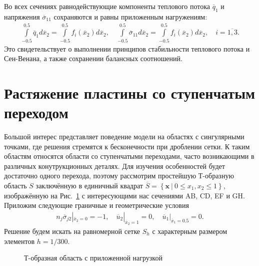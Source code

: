 Во всех сечениях равнодействующие компоненты теплового потока $\overline{q}_1$ и напряжения $\overline{\sigma}_{11}$ сохраняются и равны приложенным нагружениям:
\begin{gather*}
	\int\limits_{-0.5}^{0.5} \overline{q}_1 d\overline{x}_2 = 
	\int\limits_{-0.5}^{0.5} f_i (\overline{x}_2) d\overline{x}_2,
	\quad
	\int\limits_{-0.5}^{0.5} \overline{\sigma}_{11} d\overline{x}_2 = 
	\int\limits_{-0.5}^{0.5} f_i (\overline{x}_2) d\overline{x}_2,
	\quad	
	i = \overline{1,3}.
\end{gather*}
Это свидетельствует о выполнении принципов стабильности теплового потока и Сен-Венана, а также сохранении балансных соотношений.

\section{Растяжение пластины со ступенчатым переходом}\label{sec:ResultsAnalysis/TShape}

Большой интерес представляет поведение модели на областях с сингулярными точками, где решения стремятся к бесконечности при дроблении сетки. К таким областям относятся области со ступенчатыми переходами, часто возникающими в различных конутрукционных деталях. Для изучения особенностей будет достаточно одного перехода, поэтому рассмотрим простейшую Т-образную область $S$ заключённую в единичный квадрат $\overline{S} = \left\{ \boldsymbol{x} \ | \ 0 \leqslant x_1, x_2 \leqslant 1 \right\}$, изображённую на Рис.~\ref{fig:TArea} с интересующими нас сечениями AB, CD, EF и GH. Приложим следующие граничные и геометрические условия
\begin{gather*}
	n_j \overline{\sigma}_{j2} |_{\overline{x}_2 = 0} = -1,
	\quad
	\overline{u}_2 |_{\overline{x}_2 = 1} = 0,
	\quad
	\overline{u}_1 |_{\overline{x}_1 = 0.5} = 0.
\end{gather*}
Решение будем искать на равномерной сетке $S_h$ с характерным размером элементов $h = 1/300$.

\begin{figure}[ht]
    \caption{Т-образная область с приложенной нагрузкой}
    \label{fig:TArea}
\end{figure}

